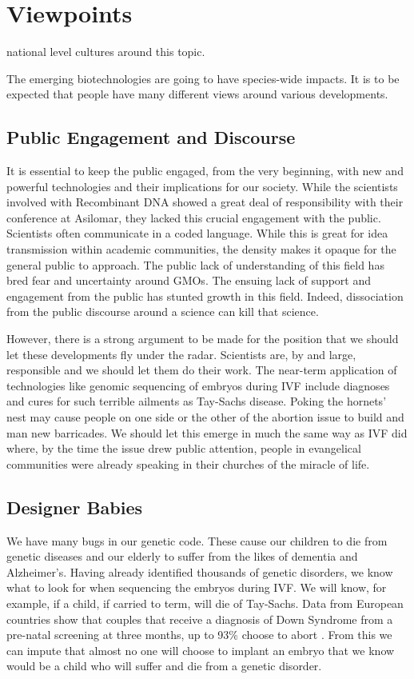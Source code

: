 \section{Viewpoints}
\label{sec:viewpoints}

national level cultures around this topic.

The emerging biotechnologies are going to have species-wide impacts.
It is to be expected that people have many different views around various developments.

\subsection{Public Engagement and Discourse}

It is essential to keep the public engaged, from the very beginning, with new and powerful technologies and their implications for our society.
While the scientists involved with Recombinant DNA showed a great deal of responsibility with their conference at Asilomar, they lacked this crucial engagement with the public.
Scientists often communicate in a coded language.
While this is great for idea transmission within academic communities, the density makes it opaque for the general public to approach.
The public lack of understanding of this field has bred fear and uncertainty around GMOs.
The ensuing lack of support and engagement from the public has stunted growth in this field.
Indeed, dissociation from the public discourse around a science can kill that science.

However, there is a strong argument to be made for the position that we should let these developments fly under the radar.
Scientists are, by and large, responsible and we should let them do their work.
The near-term application of technologies like genomic sequencing of embryos during IVF include diagnoses and cures for such terrible ailments as Tay-Sachs disease.
Poking the hornets' nest may cause people on one side or the other of the abortion issue to build and man new barricades.
We should let this emerge in much the same way as IVF did where, by the time the issue drew public attention, people in evangelical communities were already speaking in their churches of the miracle of life.

\subsection{Designer Babies}

We have many bugs in our genetic code.
These cause our children to die from genetic diseases and our elderly to suffer from the likes of dementia and Alzheimer's.
Having already identified thousands of genetic disorders, we know what to look for when sequencing the embryos during IVF.
We will know, for example, if a child, if carried to term, will die of Tay-Sachs.
Data from European countries show that couples that receive a diagnosis of Down Syndrome from a pre-natal screening at three months, up to 93\% choose to abort \cite{Natoli2012}.
From this we can impute that almost no one will choose to implant an embryo that we know would be a child who will suffer and die from a genetic disorder.


